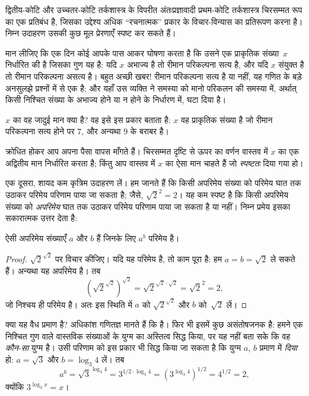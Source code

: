 \documentclass[../../../include/open-logic-section]{subfiles}
\begin{document}


द्वितीय-कोटि और उच्चतर-कोटि तर्कशास्त्र के विपरीत अंतःप्रज्ञावादी
प्रथम-कोटि तर्कशास्त्र चिरसम्मत रूप का एक प्रतिबंध है, जिसका उद्देश्य अधिक
``रचनात्मक'' प्रकार के विचार-विन्यास का प्रतिरूपण करना है। निम्न उदाहरण
उसकी कुछ मूल प्रेरणाएँ स्पष्ट कर सकते हैं।

मान लीजिए कि एक दिन कोई आपके पास आकर घोषणा करता है कि उसने एक प्राकृतिक
संख्या~$x$ निर्धारित की है जिसका गुण यह है: यदि $x$ अभाज्य है तो रीमान
परिकल्पना सत्य है, और यदि $x$ संयुक्त है तो रीमान परिकल्पना असत्य है। बहुत
अच्छी खबर!{} रीमान परिकल्पना सत्य है या नहीं, यह गणित के बड़े अनसुलझे
प्रश्नों में से एक है; और यहाँ उस व्यक्ति ने समस्या को मानो परिकलन की समस्या
में, अर्थात् किसी निश्चित संख्या के अभाज्य होने या न होने के निर्धारण में,
घटा दिया है।

$x$ का वह जादुई मान क्या है? वह इसे इस प्रकार बताता है: $x$ वह प्राकृतिक
संख्या है जो रीमान परिकल्पना सत्य होने पर $7$, और अन्यथा $9$ के बराबर है।

क्रोधित होकर आप अपना पैसा वापस माँगते हैं। चिरसम्मत दृष्टि से ऊपर का वर्णन
वास्तव में $x$ का एक अद्वितीय मान निर्धारित करता है; किंतु आप वास्तव में
$x$ का ऐसा मान चाहते हैं जो \emph{स्पष्टतः} दिया गया हो।

एक दूसरा, शायद कम कृत्रिम उदाहरण लें। हम जानते हैं कि किसी अपरिमेय संख्या
को परिमेय घात तक उठाकर परिमेय परिणाम पाया जा सकता है; जैसे,
$\sqrt{2}^2 = 2$। यह कम स्पष्ट है कि किसी अपरिमेय संख्या को
\emph{अपरिमेय} घात तक उठाकर परिमेय परिणाम पाया जा सकता है या नहीं। निम्न
प्रमेय इसका सकारात्मक उत्तर देता है:

\begin{thm}
ऐसी अपरिमेय संख्याएँ $a$ और $b$ हैं जिनके लिए $a^b$ परिमेय है।
\end{thm}

\begin{proof}
$\sqrt{2}^{\sqrt{2}}$ पर विचार कीजिए। यदि यह परिमेय है, तो काम पूरा है:
हम $a = b = \sqrt{2}$ ले सकते हैं। अन्यथा यह अपरिमेय है। तब
\[
(\sqrt{2}^{\sqrt{2}})^{\sqrt{2}} = \sqrt{2}^{\sqrt{2} \cdot
  \sqrt{2}} = \sqrt{2}^2 = 2,
\]
जो निश्चय ही परिमेय है। अतः इस स्थिति में $a$ को
$\sqrt{2}^{\sqrt{2}}$ और $b$ को~$\sqrt 2$ लें।
\end{proof}

क्या यह वैध प्रमाण है? अधिकांश गणितज्ञ मानते हैं कि है। फिर भी इसमें कुछ
असंतोषजनक है: हमने एक निश्चित गुण वाले वास्तविक संख्याओं के युग्म का
अस्तित्व सिद्ध किया, पर यह नहीं बता सके कि वह \emph{कौन-सा} युग्म है। उसी
परिणाम को इस प्रकार भी सिद्ध किया जा सकता है कि युग्म $a$, $b$ प्रमाण में
\emph{दिया} हो: $a = \sqrt{3}$ और $b = \log_3 4$ लें। तब
\[
a^b = \sqrt{3}^{\log_3 4} = 3^{1/2 \cdot \log_3 4} = (3^{\log_3
  4})^{1/2} = 4^{1/2}= 2,
\]
क्योंकि $3^{\log_3 x} = x$।
\end{document}
